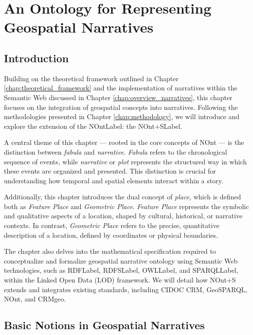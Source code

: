 \chapter{An Ontology for Representing Geospatial Narratives}\label{chap:nont+s}

\section{Introduction}\label{V-sec:introduction}

Building on the theoretical framework outlined in Chapter \ref{chap:theoretical_framework} and the implementation of narratives within the Semantic Web discussed in Chapter \ref{chap:overview_narratives}, this chapter focuses on the integration of geospatial concepts into narratives. Following the methodologies presented in Chapter \ref{chap:methodology}, we will introduce and explore the extension of the \acrfull{NOntLabel}: the \acrfull{NOnt+SLabel}.

A central theme of this chapter — rooted in the core concepts of NOnt — is the distinction between \textit{fabula} and \textit{narrative}. \textit{Fabula} refers to the chronological sequence of events, while \textit{narrative} or \textit{plot} represents the structured way in which these events are organized and presented. This distinction is crucial for understanding how temporal and spatial elements interact within a story.

Additionally, this chapter introduces the dual concept of \textit{place}, which is defined both as \textit{Feature Place} and \textit{Geometric Place}. \textit{Feature Place} represents the symbolic and qualitative aspects of a location, shaped by cultural, historical, or narrative contexts. In contrast, \textit{Geometric Place} refers to the precise, quantitative description of a location, defined by coordinates or physical boundaries.

The chapter also delves into the mathematical specification required to conceptualize and formalize geospatial narrative ontology using Semantic Web technologies, such as \acrshort{RDFLabel}, \acrshort{RDFSLabel}, \acrshort{OWLLabel}, and \acrshort{SPARQLLabel}, within the Linked Open Data (LOD) framework. We will detail how NOnt+S extends and integrates existing standards, including CIDOC CRM, GeoSPARQL, NOnt, and CRMgeo.


\section{Basic Notions in Geospatial Narratives}\label{V-sec:basicNotionGeospatialNarratives}

